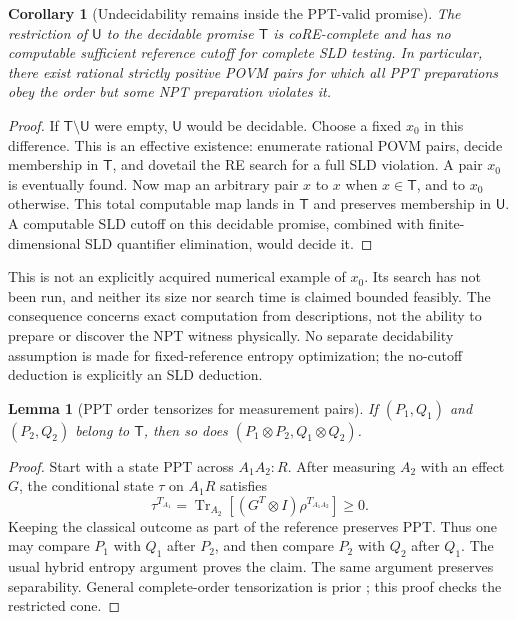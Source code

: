 \documentclass[11pt]{article}
\newtheorem{lemma}{Lemma}
\newtheorem{corollary}{Corollary}
\newcommand{\Tr}{\operatorname{Tr}}
\begin{document}
\begin{corollary}[Undecidability remains inside the PPT-valid promise]
The restriction of $\mathsf U$ to the decidable promise $\mathsf T$ is
coRE-complete and has no computable sufficient reference cutoff for complete
SLD testing.
In particular, there exist rational strictly positive POVM pairs for which
all PPT preparations obey the order but some NPT preparation violates it.
\end{corollary}
\begin{proof}
If $\mathsf T\setminus\mathsf U$ were empty, $\mathsf U$ would be decidable.
Choose a fixed $x_0$ in this difference. This is an effective existence:
enumerate rational POVM pairs, decide membership in $\mathsf T$, and dovetail
the RE search for a full SLD violation. A pair $x_0$ is eventually found.
Now map an arbitrary pair $x$ to $x$ when $x\in\mathsf T$, and to $x_0$
otherwise. This total computable map lands in $\mathsf T$ and preserves
membership in $\mathsf U$. A computable SLD cutoff on this decidable promise,
combined with finite-dimensional SLD quantifier elimination, would decide it.
\end{proof}

This is not an explicitly acquired numerical example of $x_0$. Its search has
not been run, and neither its size nor search time is claimed bounded feasibly.
The consequence concerns exact computation from descriptions, not the ability
to prepare or discover the NPT witness physically.
No separate decidability assumption is made for fixed-reference entropy
optimization; the no-cutoff deduction is explicitly an SLD deduction.

\begin{lemma}[PPT order tensorizes for measurement pairs]
If $(P_1,Q_1)$ and $(P_2,Q_2)$ belong to $\mathsf T$, then so does
$(P_1\otimes P_2,Q_1\otimes Q_2)$.
\end{lemma}
\begin{proof}
Start with a state PPT across $A_1A_2:R$. After measuring $A_2$ with an effect
$G$, the conditional state $\tau$ on $A_1R$ satisfies
\[
 \tau^{T_{A_1}}
   =\Tr_{A_2}[(G^T\otimes I)\rho^{T_{A_1A_2}}]\geq0.
\]
Keeping the classical outcome as part of the reference preserves PPT.
Thus one may compare $P_1$ with $Q_1$ after $P_2$, and then compare $P_2$
with $Q_2$ after $Q_1$. The usual hybrid entropy argument proves the claim.
The same argument preserves separability. General complete-order
tensorization is prior \cite{hirche}; this proof checks the restricted cone.
\end{proof}
\end{document}
